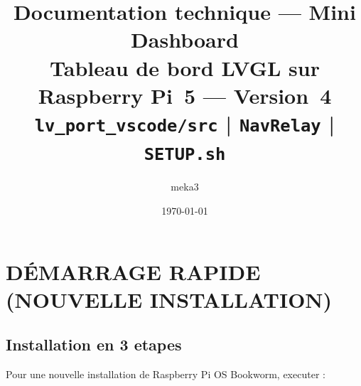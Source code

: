 \documentclass[a4paper,11pt]{article}
\title{\textbf{Documentation technique --- Mini Dashboard}\\
\large Tableau de bord LVGL sur Raspberry Pi~5 --- Version~4\\
\normalsize \texttt{lv\_port\_vscode/src} \quad | \quad \texttt{NavRelay} \quad | \quad \texttt{SETUP.sh}}
\author{meka3}
\date{\today}
\begin{document}
\maketitle
\tableofcontents
\newpage

\section{DÉMARRAGE RAPIDE (NOUVELLE INSTALLATION)}

\subsection{Installation en 3 etapes}

Pour une nouvelle installation de Raspberry Pi OS Bookworm, executer :
\end{document}
